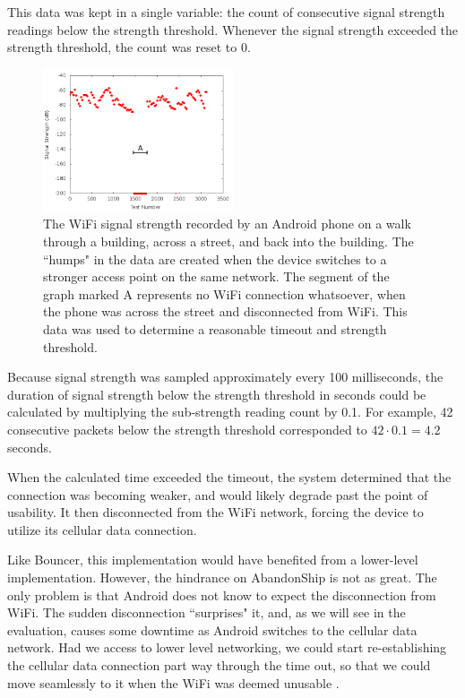This data was kept in a single variable: the count of consecutive signal strength readings below the strength threshold. Whenever the signal strength exceeded the strength threshold, the count was reset to 0.

\begin{figure}
	\includegraphics[width=0.5\textwidth]{sigStrength}
	\caption{The WiFi signal strength recorded by an Android phone on a walk through a building, across a street, and back into the building. The ``humps" in the data are created when the device switches to a stronger access point on the same network. The segment of the graph marked A represents no WiFi connection whatsoever, when the phone was across the street and disconnected from WiFi. This data was used to determine a reasonable timeout and strength threshold.}
\end{figure}

Because signal strength was sampled approximately every 100 milliseconds, the duration of signal strength below the strength threshold in seconds could be calculated by multiplying the sub-strength reading count by 0.1. For example, 42 consecutive packets below the strength threshold corresponded to $ 42 \cdot 0.1 = 4.2 $ seconds.

When the calculated time exceeded the timeout, the system determined that the connection was becoming weaker, and would likely degrade past the point of usability. It then disconnected from the WiFi network, forcing the device to utilize its cellular data connection.

Like Bouncer, this implementation would have benefited from a lower-level implementation. However, the hindrance on AbandonShip is not as great. The only problem is that Android does not know to expect the disconnection from WiFi. The sudden disconnection ``surprises" it, and, as we will see in the evaluation, causes some downtime as Android switches to the cellular data network. Had we access to lower level networking, we could start re-establishing the cellular data connection part way through the time out, so that we could move seamlessly to it when the WiFi was deemed unusable
.
